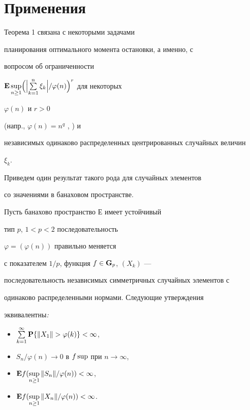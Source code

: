 




\section{Применения}





Теорема 1 связана с некоторыми задачами


планирования оптимального момента остановки, а именно, с


вопросом об ограниченности


${\bold E} \sup\limits_{n\ge 1}\Bigl(\Bigl|\sum\limits^{n}_{k=1} \xi _{k}


\Bigr|/ \varphi (n)\Bigr)^{r}$ для некоторых


$\varphi (n)$ и $r>0$\linebreak




(напр., $\varphi (n)=n^{q}$ \cite{Hof}, \cite{Choi}) и


независимых одинаково распределенных центрированных случайных величин


$\xi _{k} $.


Приведем один результат такого рода для случайных элементов


со значениями в банаховом пространстве.





\begin{thm} Пусть банахово пространство $Е$ имеет устойчивый


тип $p$, $1<p<2$ последовательность


$\varphi =(\varphi (n))$ правильно меняется


с показателем $1/p$, функция $f\in {\bold G}_{p}$, $(X_{k} )$ ---


последовательность независимых симметричных случайных элементов с


одинаково распределенными нормами. Следующие утверждения


эквивалентны{\em :}


\begin{itemize}


\item[(1)] $\sum\limits^{\infty }_{k=1} {\bold P} \{\| X_{1} \|


>\varphi (k)\}< \infty$,


\item[(2)] $S _{n} /\varphi (n)\to 0$ в $f\sup$ при $n\to\infty$,


\item[(3)] $ {\bold E} f(\sup\limits_{n\ge 1}\| S _{n} \| /


\varphi (n))< \infty$,


\item[(4)] $ {\bold E} f(\sup\limits_{n\ge 1}\| X_{n} \| /


\varphi (n))< \infty$.


\end{itemize}


\end{thm}





